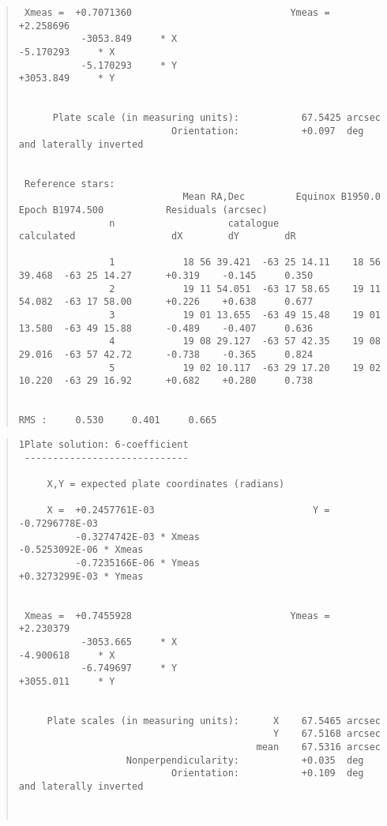 \documentclass[twoside,11pt]{article}
\renewcommand{\_}{\texttt{\symbol{95}}}
\begin{document}
\begin{tiny}
\begin{quote}
\begin{verbatim}
 Xmeas =  +0.7071360                            Ymeas =   +2.258696
           -3053.849     * X                              -5.170293     * X
           -5.170293     * Y                              +3053.849     * Y


      Plate scale (in measuring units):           67.5425 arcsec
                           Orientation:           +0.097  deg and laterally inverted


 Reference stars:
                             Mean RA,Dec         Equinox B1950.0      Epoch B1974.500           Residuals (arcsec)
                n                    catalogue                     calculated                 dX        dY        dR

                1            18 56 39.421  -63 25 14.11    18 56 39.468  -63 25 14.27      +0.319    -0.145     0.350
                2            19 11 54.051  -63 17 58.65    19 11 54.082  -63 17 58.00      +0.226    +0.638     0.677
                3            19 01 13.655  -63 49 15.48    19 01 13.580  -63 49 15.88      -0.489    -0.407     0.636
                4            19 08 29.127  -63 57 42.35    19 08 29.016  -63 57 42.72      -0.738    -0.365     0.824
                5            19 02 10.117  -63 29 17.20    19 02 10.220  -63 29 16.92      +0.682    +0.280     0.738

                                                                                  RMS :     0.530     0.401     0.665
\end{verbatim}
\end{quote}

\newpage

\begin{quote}
\begin{verbatim}
1Plate solution: 6-coefficient
 -----------------------------

     X,Y = expected plate coordinates (radians)

     X =  +0.2457761E-03                            Y =  -0.7296778E-03
          -0.3274742E-03 * Xmeas                         -0.5253092E-06 * Xmeas
          -0.7235166E-06 * Ymeas                         +0.3273299E-03 * Ymeas


 Xmeas =  +0.7455928                            Ymeas =   +2.230379
           -3053.665     * X                              -4.900618     * X
           -6.749697     * Y                              +3055.011     * Y


     Plate scales (in measuring units):      X    67.5465 arcsec
                                             Y    67.5168 arcsec
                                          mean    67.5316 arcsec
                   Nonperpendicularity:           +0.035  deg
                           Orientation:           +0.109  deg and laterally inverted



\end{verbatim}
\end{quote}
\end{tiny}
\end{document}
